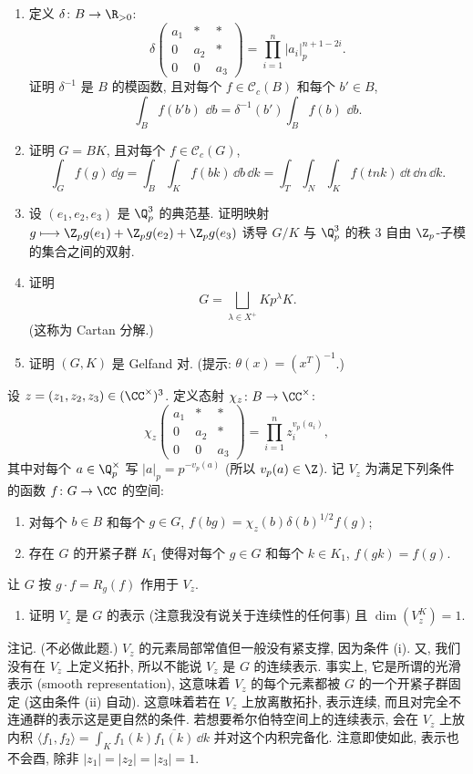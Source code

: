 \begin{enumerate}
\item[(1)] 定义 $\delta \colon B \to \R_{>0}$:
\[
\delta\begin{pmatrix} a_1 & * & * \\ 0 & a_2 & * \\ 0 & 0 & a_3 \end{pmatrix} = \prod_{i=1}^n|a_i|_p^{n+1-2i}.
\]
证明 $\delta^{-1}$ 是 $B$ 的模函数, 且对每个 $f \in \mathcal{C}_c(B)$ 和每个 $b' \in B$,
\[
\int_B f(b'b)\,\,\dd b = \delta^{-1}(b')\int_B f(b)\,\,\dd b.
\]
\item[(2)] 证明 $G = BK$, 且对每个 $f \in \mathcal{C}_c(G)$,
\[
\int_G f(g)\,\dd g = \int_B\int_K f(bk)\,\dd b\,\dd k = \int_T\int_N\int_K f(tnk)\,\dd t\,\dd n\,\dd k.
\]
\item[(3)] 设 $(e_1, e_2, e_3)$ 是 $\Q_p^3$ 的典范基. 证明映射 $g \longmapsto \Z_pg(e_1) + \Z_pg(e_2) + \Z_pg(e_3)$ 诱导 $G/K$ 与 $\Q_p^3$ 的秩 $3$ 自由 $\Z_p$-子模的集合之间的双射.
\item[(4)] 证明
\[
G = \bigsqcup_{\lambda \in X^+}Kp^{\lambda}K.
\]
(这称为 Cartan 分解.)
\item[(5)] 证明 $(G, K)$ 是 Gelfand 对. (提示: $\theta(x) = (x^T)^{-1}$.)
\end{enumerate}
设 $z = (z_1, z_2, z_3) \in (\CC^{\times})^3$. 定义态射 $\chi_z \colon B \to \CC^{\times}$:
\[
\chi_z\begin{pmatrix} a_1 & * & * \\ 0 & a_2 & * \\ 0 & 0 & a_3 \end{pmatrix} = \prod_{i=1}^n z_i^{v_p(a_i)},
\]
其中对每个 $a \in \Q_p^{\times}$ 写 $|a|_p = p^{-v_p(a)}$ (所以 $v_p(a) \in \Z$). 记 $V_z$ 为满足下列条件的函数 $f \colon G \to \CC$ 的空间:
\begin{enumerate}
\item[(i)] 对每个 $b \in B$ 和每个 $g \in G$, $f(bg) = \chi_z(b)\delta(b)^{1/2}f(g)$;
\item[(ii)] 存在 $G$ 的开紧子群 $K_1$ 使得对每个 $g \in G$ 和每个 $k \in K_1$, $f(gk) = f(g)$.
\end{enumerate}
让 $G$ 按 $g \cdot f = R_g(f)$ 作用于 $V_z$.
\begin{enumerate}
\item[(6)] 证明 $V_z$ 是 $G$ 的表示 (注意我没有说关于连续性的任何事) 且 $\dim(V_z^K) = 1$.
\end{enumerate}
注记. (不必做此题.) $V_z$ 的元素局部常值但一般没有紧支撑, 因为条件 (i). 又, 我们没有在 $V_z$ 上定义拓扑, 所以不能说 $V_z$ 是 $G$ 的连续表示. 事实上, 它是所谓的光滑表示 (smooth representation), 这意味着 $V_z$ 的每个元素都被 $G$ 的一个开紧子群固定 (这由条件 (ii) 自动). 这意味着若在 $V_z$ 上放离散拓扑, 表示连续, 而且对完全不连通群的表示这是更自然的条件. 若想要希尔伯特空间上的连续表示, 会在 $V_z$ 上放内积 $\langle f_1, f_2 \rangle = \int_K f_1(k)\overline{f_1(k)}\,\dd k$ 并对这个内积完备化. 注意即使如此, 表示也不会酉, 除非 $|z_1| = |z_2| = |z_3| = 1$.
